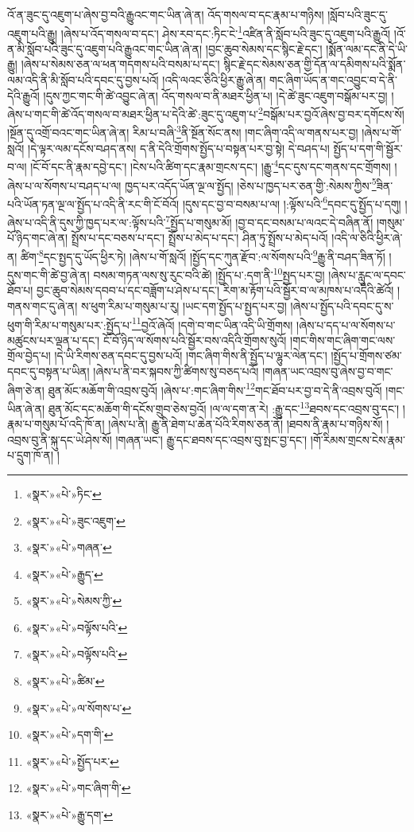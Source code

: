 འོ་ན་ཟུང་དུ་འཇུག་པ་ཞེས་བྱ་བའི་རྒྱུའང་གང་ཡིན་ཞེ་ན། འོད་གསལ་བ་དང་རྣམ་པ་གཉིས། །སློབ་པའི་ཟུང་དུ་འཇུག་པའི་རྒྱུ། །ཞེས་པ་འོད་གསལ་བ་དང་། ཤེས་རབ་དང་:ཏིང་ངེ་\footnote{«སྣར་»«པེ་»ཏིང་}འཛིན་ནི་སློབ་པའི་ཟུང་དུ་འཇུག་པའི་རྒྱུའོ། །འོ་ན་མི་སློབ་པའི་ཟུང་དུ་འཇུག་པའི་རྒྱུའང་གང་ཡིན་ཞེ་ན། །བྱང་ཆུབ་སེམས་དང་སྙིང་རྗེ་དང་། །སྨོན་ལམ་དང་ནི་དེ་ཡི་རྒྱུ། །ཞེས་པ་སེམས་ཅན་ལ་ཕན་གདགས་པའི་བསམ་པ་དང་། སྙིང་རྗེ་དང་སེམས་ཅན་གྱི་དོན་ལ་དམིགས་པའི་སྨོན་ལམ་འདི་ནི་མི་སློབ་པའི་དབང་དུ་བྱས་པའོ། །འདི་ལའང་ཅིའི་ཕྱིར་རྒྱུ་ཞེ་ན། གང་ཞིག་ཡོད་ན་གང་འབྱུང་བ་དེ་ནི་དེའི་རྒྱུའོ། །དུས་ཀྱང་གང་གི་ཚེ་འབྱུང་ཞེ་ན། འོད་གསལ་བ་ནི་མཐར་ཕྱིན་པ། །དེ་ཚེ་ཟུང་འཇུག་བསྒོམ་པར་བྱ། །ཞེས་པ་གང་གི་ཚེ་འོད་གསལ་བ་མཐར་ཕྱིན་པ་དེའི་ཚེ་:ཟུང་དུ་འཇུག་པ་\footnote{«སྣར་»«པེ་»ཟུང་འཇུག་}བསྒོམ་པར་བྱའོ་ཞེས་བྱ་བར་དགོངས་སོ། །སྔོན་དུ་འགྲོ་བའང་གང་ཡིན་ཞེ་ན། རིམ་པ་བཞི་\footnote{«སྣར་»«པེ་»གཞན་}ནི་སྔོན་སོང་ནས། །གང་ཞིག་འདི་ལ་གནས་པར་བྱ། །ཞེས་པ་གོ་སླའོ། །དེ་ལྟར་ལམ་དངོས་བཤད་ནས། ད་ནི་དེའི་གྲོགས་སྤྱོད་པ་བསྟན་པར་བྱ་སྟེ། དེ་བཤད་པ། སྤྱོད་པ་དག་གི་སྦྱོར་བ་ལ། །ངོ་བོ་དང་ནི་རྣམ་དབྱེ་དང་། །ངེས་པའི་ཚིག་དང་རྣམ་གྲངས་དང་། །རྒྱུ་\footnote{«སྣར་»«པེ་»རྒྱུད་}དང་དུས་དང་གནས་དང་གྲོགས། །ཞེས་པ་ལ་སོགས་པ་བཤད་པ་ལ། ཁྱད་པར་འདོད་ཡོན་ལྔ་ལ་སྤྱོད། །ཅེས་པ་ཁྱད་པར་ཅན་གྱི་:སེམས་ཀྱིས་\footnote{«སྣར་»«པེ་»སེམས་ཀྱི་}ཟིན་པའི་ཡོན་ཏན་ལྔ་ལ་སྤྱོད་པ་འདི་ནི་རང་གི་ངོ་བོའོ། །དུས་དང་བྱ་བ་བསམ་པ་ལ། །:ལྟོས་པའི་\footnote{«སྣར་»«པེ་»བལྟོས་པའི་}དབང་དུ་སྤྱོད་པ་དགུ། །ཞེས་པ་འདི་ནི་དུས་ཀྱི་ཁྱད་པར་ལ་:ལྟོས་པའི་\footnote{«སྣར་»«པེ་»བལྟོས་པའི་}སྤྱོད་པ་གསུམ་མོ། །བྱ་བ་དང་བསམ་པ་ལའང་དེ་བཞིན་ནོ། །གསུམ་པོ་ཉིད་གང་ཞེ་ན། སྤྲོས་པ་དང་བཅས་པ་དང་། སྤྲོས་པ་མེད་པ་དང་། ཤིན་ཏུ་སྤྲོས་པ་མེད་པའོ། །འདི་ལ་ཅིའི་ཕྱིར་ཞེ་ན། ཚིག་\footnote{«སྣར་»«པེ་»ཚིམ་}དང་སྤྱད་དུ་ཡོད་ཕྱིར་ཏེ། །ཞེས་པ་གོ་སླའོ། །སྤྱོད་དང་ཀུན་རྫོབ་:ལ་སོགས་པའི་\footnote{«སྣར་»«པེ་»ལ་སོགས་པ་}རྒྱུ་ནི་བཤད་ཟིན་ཏོ། །དུས་གང་གི་ཚེ་བྱ་ཞེ་ན། བསམ་གཏན་ལས་སུ་རུང་བའི་ཚེ། །སྤྱོད་པ་:དག་ནི་\footnote{«སྣར་»«པེ་»དག་གི་}སྤྱད་པར་བྱ། །ཞེས་པ་རླུང་ལ་དབང་ཐོབ་པ། བྱང་ཆུབ་སེམས་དབབ་པ་དང་བཟློག་པ་ཤེས་པ་དང་། རིག་མ་རྟོག་པའི་སྦྱོར་བ་ལ་མཁས་པ་འདིའི་ཚེའོ། །གནས་གང་དུ་ཞེ་ན། ས་ཕུག་རིམ་པ་གསུམ་པ་རུ། །ཡང་དག་སྤྱོད་པ་སྤྱད་པར་བྱ། །ཞེས་པ་སྤྱོད་པའི་དབང་དུ་ས་ཕུག་གི་རིམ་པ་གསུམ་པར་:སྤྱོད་པ་\footnote{«སྣར་»«པེ་»སྤྱོད་པར་}བྱའོ་ཞེའོ། །དགེ་བ་གང་ཡིན་འདི་ཡི་གྲོགས། །ཞེས་པ་དད་པ་ལ་སོགས་པ་མཚུངས་པར་ལྡན་པ་དང་། ངོ་བོ་ཉིད་ལ་སོགས་པའི་སྦྱོར་བས་འདིའི་གྲོགས་སུའོ། །གང་གིས་གང་ཞིག་གང་ལས་གྲོལ་བྱེད་པ། །དེ་ཡི་རིགས་ཅན་དབང་དུ་བྱས་པའོ། །གང་ཞིག་གིས་ནི་སྤྱོད་པ་ལྷུར་ལེན་དང་། །སྤྱོད་པ་གྲོགས་ཙམ་དབང་དུ་བསྟན་པ་ཡིན། །ཞེས་པ་ནི་བར་སྐབས་ཀྱི་ཚིགས་སུ་བཅད་པའོ། །གཞན་ཡང་འབྲས་བུ་ཞེས་བྱ་བ་གང་ཞིག་ཅེ་ན། ཐུན་མོང་མཆོག་གི་འབྲས་བུའོ། །ཞེས་པ་:གང་ཞིག་གིས་\footnote{«སྣར་»«པེ་»གང་ཞིག་གི་}གང་ཐོབ་པར་བྱ་བ་དེ་ནི་འབྲས་བུའོ། །གང་ཡིན་ཞེ་ན། ཐུན་མོང་དང་མཆོག་གི་དངོས་གྲུབ་ཅེས་བྱའོ། །ལ་ལ་དག་ན་རེ། :རྒྱུ་དང་\footnote{«སྣར་»«པེ་»རྒྱུ་དག་}ཐབས་དང་འབྲས་བུ་དང་། །རྣམ་པ་གསུམ་པོ་འདི་ཁོ་ན། །ཞེས་པ་ནི། རྒྱུ་ནི་ཐེག་པ་ཆེན་པོའི་རིགས་ཅན་ནོ། །ཐབས་ནི་རྣམ་པ་གཉིས་སོ། །འབྲས་བུ་ནི་སྐུ་དང་ཡེ་ཤེས་སོ། །གཞན་ཡང་། རྒྱུ་དང་ཐབས་དང་འབྲས་བུ་སྤང་བྱ་དང་། །གོ་རིམས་གྲངས་ངེས་རྣམ་པ་དྲུག་ཁོ་ན། །
